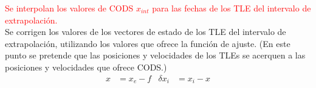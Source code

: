 {\textcolor{red}{Se interpolan los valores de CODS $x_{int}$ para las fechas de los TLE del intervalo de extrapolaci\'on.}}\\
Se corrigen los valores de los vectores de estado de los TLE del intervalo de extrapolaci\'on, utilizando los valores que ofrece la funci\'on de ajuste. (En este punto se pretende que las posiciones y velocidades de los TLEs se acerquen a las posiciones y velocidades que ofrece CODS.)\\
\begin{align}
 x&=x_{e}-f & \delta x_{i}& = x_{i} - x 
\end{align}


